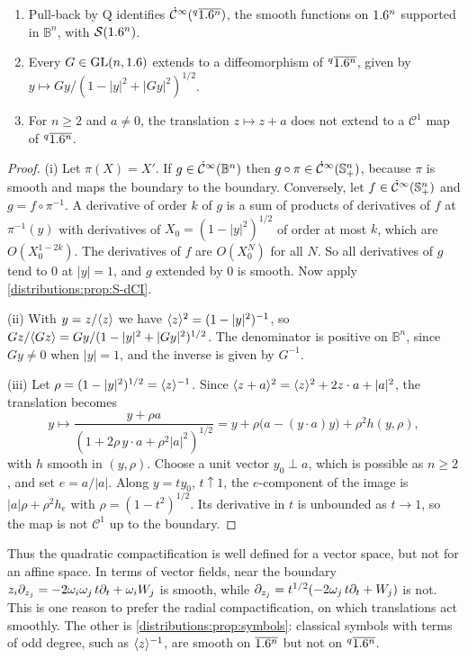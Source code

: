 \begin{proposition}\label{distributions:prop:QRC}
\begin{enumerate}[label=(\roman*)]
\item Pull-back by $\mathrm{Q}$ identifies $\dot{\mathcal{C}}^\infty({}^{q}\overline{1.6^n})$, the smooth functions on
  $1.6^n$ supported in $\mathbb{B}^n$, with $\mathcal{S}(1.6^n)$.
\item Every $G\in\operatorname{GL}(n,1.6)$ extends to a diffeomorphism of ${}^{q}\overline{1.6^n}$, given by
  $y\mapsto Gy/(1-|y|^2+|Gy|^2)^{1/2}$.
\item For $n\ge2$ and $a\neq0$, the translation $z\mapsto z+a$ does not extend to a
  $\mathcal{C}^1$ map of ${}^{q}\overline{1.6^n}$.
\end{enumerate}
\end{proposition}
\begin{proof}
(i) Let $\pi(X)=X'$. If $g\in\dot{\mathcal{C}}^\infty(\mathbb{B}^n)$ then $g\circ\pi\in\dot{\mathcal{C}}^\infty(\mathbb{S}^n_+)$,
because $\pi$ is smooth and maps the boundary to the boundary. Conversely, let
$f\in\dot{\mathcal{C}}^\infty(\mathbb{S}^n_+)$ and $g=f\circ\pi^{-1}$. A derivative of order $k$ of $g$ is a
sum of products of derivatives of $f$ at $\pi^{-1}(y)$ with derivatives of
$X_0=(1-|y|^2)^{1/2}$ of order at most $k$, which are $O(X_0^{1-2k})$. The derivatives
of $f$ are $O(X_0^N)$ for all $N$. So all derivatives of $g$ tend to $0$ at $|y|=1$, and
$g$ extended by $0$ is smooth. Now apply \cref{distributions:prop:S-dCI}.

(ii) With $y=z/\langle z\rangle$ we have $\langle z\rangle^2=(1-|y|^2)^{-1}$, so
$Gz/\langle Gz\rangle=Gy/(1-|y|^2+|Gy|^2)^{1/2}$. The denominator is positive on $\mathbb{B}^n$,
since $Gy\neq0$ when $|y|=1$, and the inverse is given by $G^{-1}$.

(iii) Let $\rho=(1-|y|^2)^{1/2}=\langle z\rangle^{-1}$. Since $\langle z+a\rangle^2=\langle z\rangle^2+2z\cdot a+|a|^2$,
the translation becomes
\[
  y\longmapsto\frac{y+\rho a}{(1+2\rho\,y\cdot a+\rho^2|a|^2)^{1/2}}
  =y+\rho\big(a-(y\cdot a)y\big)+\rho^2h(y,\rho),
\]
with $h$ smooth in $(y,\rho)$. Choose a unit vector $y_0\perp a$, which is possible as
$n\ge2$, and set $e=a/|a|$. Along $y=ty_0$, $t\uparrow1$, the $e$-component of the image
is $|a|\rho+\rho^2h_e$ with $\rho=(1-t^2)^{1/2}$. Its derivative in $t$ is unbounded as
$t\to1$, so the map is not $\mathcal{C}^1$ up to the boundary.
\end{proof}

Thus the quadratic compactification is well defined for a vector space, but not for an
affine space. In terms of vector fields, near the boundary
$z_i\partial_{z_j}=-2\omega_i\omega_j\,t\partial_t+\omega_iW_j$ is smooth, while
$\partial_{z_j}=t^{1/2}(-2\omega_j\,t\partial_t+W_j)$ is not. This is one reason to prefer the radial
compactification, on which translations act smoothly. The other is
\cref{distributions:prop:symbols}: classical symbols with terms of odd degree, such as
$\langle z\rangle^{-1}$, are smooth on $\overline{1.6^n}$ but not on ${}^{q}\overline{1.6^n}$.

